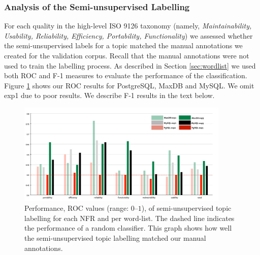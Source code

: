 \documentclass[smallextended]{svjour3}       %
\begin{document}
\subsubsection{Analysis of the Semi-unsupervised Labelling} %
For each quality in the high-level ISO 9126 taxonomy (namely, \emph{Maintainability, Usability, Reliability, Efficiency, Portability, Functionality}) we assessed whether the semi-unsupervised labels for a topic matched the manual annotations we created for the validation corpus. 
Recall that the manual annotations were not used to
train the labelling process.
As described in Section \ref{sec:wordlist} we used both ROC and F-1 measures to evaluate the performance of the classification.
Figure \ref{fig:maxdb-unsup-results} shows our ROC results for PostgreSQL, MaxDB and MySQL. We omit \textsf{exp1} due to poor results. We describe F-1 results in the text below.





\begin{figure}[t]
  \centering
 \includegraphics[width=0.9\textwidth]{figures/unsupervised-bar}
 \caption{Performance, ROC values (range: $0$--$1$), of semi-unsupervised topic labelling for
   each NFR and per word-list. The dashed line indicates the performance of a random classifier. This graph shows how well the
   semi-unsupervised topic labelling matched our manual annotations.}


  \label{fig:maxdb-unsup-results}
\end{figure}
\end{document}
